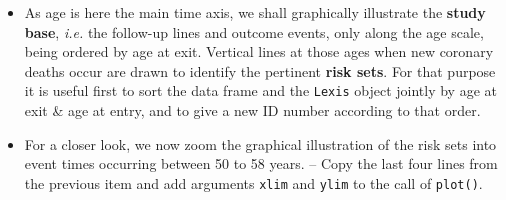 \documentclass[
]{book}
\newenvironment{Shaded}{\begin{snugshade}}{\end{snugshade}}
\newcommand{\AttributeTok}[1]{\textcolor[rgb]{0.13,0.29,0.53}{#1}}
\newcommand{\ConstantTok}[1]{\textcolor[rgb]{0.56,0.35,0.01}{#1}}
\newcommand{\DecValTok}[1]{\textcolor[rgb]{0.00,0.00,0.81}{#1}}
\newcommand{\FunctionTok}[1]{\textcolor[rgb]{0.13,0.29,0.53}{\textbf{#1}}}
\newcommand{\NormalTok}[1]{#1}
\newcommand{\OtherTok}[1]{\textcolor[rgb]{0.56,0.35,0.01}{#1}}
\newcommand{\SpecialCharTok}[1]{\textcolor[rgb]{0.81,0.36,0.00}{\textbf{#1}}}
\newcommand{\StringTok}[1]{\textcolor[rgb]{0.31,0.60,0.02}{#1}}
\providecommand{\tightlist}{%
  \setlength{\itemsep}{0pt}\setlength{\parskip}{0pt}}
\begin{document}
\begin{itemize}
\tightlist
\item
  As age is here the main time axis,
  we shall graphically illustrate the \textbf{study base}, \emph{i.e.}
  the follow-up lines and outcome events,
  only along the age scale, being ordered by age at exit.
  Vertical lines at those ages when new coronary
  deaths occur are drawn to identify the pertinent
  \textbf{risk sets}. For that purpose it is useful first
  to sort the data frame and the \texttt{Lexis} object
  jointly by age at exit \& age at entry,
  and to give a new ID number according to that order.
\end{itemize}

\begin{Shaded}
\end{Shaded}

\begin{itemize}
\tightlist
\item
  For a closer look, we now
  zoom the graphical illustration of the risk sets into
  event times occurring between 50 to 58 years. --
  Copy the last four lines from the previous item and add arguments \texttt{xlim} and \texttt{ylim}
  to the call of \texttt{plot()}.
\end{itemize}
\end{document}
